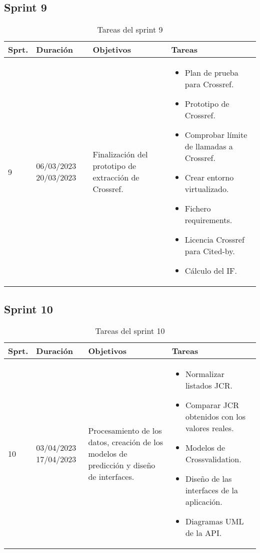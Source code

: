 \subsection{Sprint 9}
\begin{table}[h]
\centering
\begin{tabularx}{\textwidth}{llll}
\toprule
\textbf{Sprt.} & \textbf{Duración} & \textbf{Objetivos} & \textbf{Tareas}\\
\midrule
     9 & \parbox{55}{06/03/2023 20/03/2023} & \parbox{80}{Finalización del prototipo de extracción de Crossref.} & \parbox{150}{\begin{itemize}\item Plan de prueba para Crossref. \item Prototipo de Crossref. \item Comprobar límite de llamadas a Crossref. \item Crear entorno virtualizado. \item Fichero requirements. \item Licencia Crossref para Cited-by. \item Cálculo del IF.\end{itemize}}\\
\bottomrule
\end{tabularx}
\caption{Tareas del sprint 9}
\label{tab:sprint9}
\end{table}


\subsection{Sprint 10}
\begin{table}[h]
\centering
\begin{tabularx}{\textwidth}{llll}
\toprule
\textbf{Sprt.} & \textbf{Duración} & \textbf{Objetivos} & \textbf{Tareas}\\
\midrule
    10 & \parbox{55}{03/04/2023 17/04/2023} & \parbox{80}{Procesamiento de los datos, creación de los modelos de predicción y diseño de interfaces.} & \parbox{150}{\begin{itemize}\item Normalizar listados JCR. \item Comparar JCR obtenidos con los valores reales.\item Modelos de Crossvalidation. \item Diseño de las interfaces de la aplicación. \item Diagramas UML de la API.\end{itemize}}\\
\bottomrule
\end{tabularx}
\caption{Tareas del sprint 10}
\label{tab:sprint10}
\end{table}

